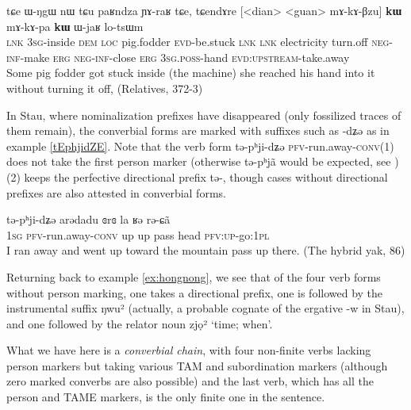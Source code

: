 \documentclass[oldfontcommands,oneside,a4paper,11pt]{article}
\newcommand{\ipa}[1]{{\phon \mbox{#1}}} %
\begin{document}
\begin{exe}
\ex \label{ex:mAkApa.kW}
\gll
\ipa{tɕe}   	\ipa{ɯ-ŋgɯ}   	\ipa{nɯ} \ipa{tɕu}   	\ipa{paʁndza}   	\ipa{ɲɤ-raʁ}   	\ipa{tɕe,}   	\ipa{tɕendɤre}   	[<dian>   	<guan>   	\ipa{mɤ-kɤ-βzu}] 	\ipa{\textbf{kɯ}}   	\ipa{mɤ-kɤ-pa}   	\ipa{\textbf{kɯ}}   	\ipa{ɯ-jaʁ}   	\ipa{lo-tsɯm}   \\
\textsc{lnk} \textsc{3sg}-inside \textsc{dem} \textsc{loc} pig.fodder \textsc{evd}-be.stuck \textsc{lnk}
\textsc{lnk} electricity turn.off \textsc{neg-inf}-make \textsc{erg}  \textsc{neg-inf}-close \textsc{erg}  \textsc{3sg.poss}-hand \textsc{evd:upstream}-take.away \\
\glt Some pig fodder got stuck inside (the machine) she reached his hand into it without turning it off, (Relatives, 372-3)
\end{exe} 

In Stau, where nominalization prefixes have disappeared (only  fossilized traces of them remain), the converbial forms are marked with suffixes such as \ipa{-dʑə} as in example \ref{tEphjidZE}. Note that the verb form \ipa{tə-pʰji-dʑə} \textsc{pfv}-run.away-\textsc{conv}(1) does not take the first person marker (otherwise \ipa{tə-pʰjã} would be expected, see \citealt{jacques14rtau}) (2) keeps the perfective directional prefix \ipa{tə-}, though cases without directional prefixes are also attested in converbial forms.

\begin{exe}
\ex \label{tEphjidZE}
\gll \ipa{ŋa} 	\ipa{tə-pʰji-dʑə} 	\ipa{arədadu} 	\ipa{ɞrɞ} 	\ipa{la} 	\ipa{ʁə} 	\ipa{rə-ɕã} \\
 \textsc{1sg} \textsc{pfv}-run.away-\textsc{conv} up up pass head \textsc{pfv:up}-go:\textsc{1pl} \\
\glt I ran away and went up toward the mountain pass up there. (The hybrid yak, 86) 
\end{exe}

Returning back to example \ref{ex:hongnong}, we see that of the four verb forms without person marking, one takes a directional prefix, one is followed by the instrumental suffix  \ipa{ŋwu²} (actually, a probable cognate of the ergative \ipa{-w} in Stau), and one followed by the relator noun  \ipa{zjọ²} `time; when'. 

What we have here is a \textit{converbial chain}, with four non-finite verbs lacking person markers but taking various TAM and subordination markers (although zero marked converbs are also possible) and the last verb, which has all the person and TAME markers, is the only finite one in the sentence.
\end{document}
